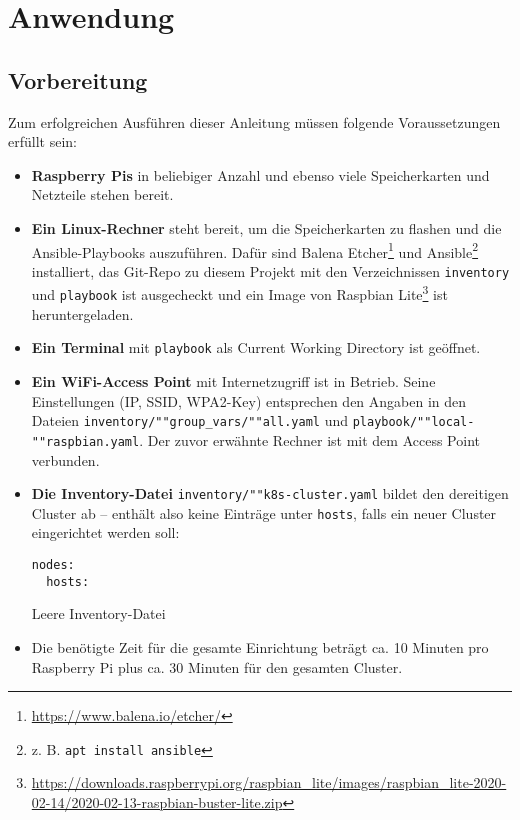 \chapter{Anwendung}


\section{Vorbereitung}
Zum erfolgreichen Ausführen dieser Anleitung müssen folgende Voraussetzungen erfüllt sein:

\begin{itemize}
    \item \textbf{Raspberry Pis} in beliebiger Anzahl und ebenso viele Speicherkarten und Netzteile stehen bereit.
    \item \textbf{Ein Linux-Rechner} steht bereit, um die Speicherkarten zu flashen und die Ansible-Playbooks auszuführen. Dafür sind Balena Etcher\footnote{\url{https://www.balena.io/etcher/}} und Ansible\footnote{z. B. \texttt{apt install ansible}} installiert, das Git-Repo zu diesem Projekt mit den Verzeichnissen \texttt{inventory} und \texttt{playbook} ist ausgecheckt und ein Image von Raspbian Lite\footnote{\url{https://downloads.raspberrypi.org/raspbian_lite/images/raspbian_lite-2020-02-14/2020-02-13-raspbian-buster-lite.zip}} ist heruntergeladen.
    \item \textbf{Ein Terminal} mit \texttt{playbook} als Current Working Directory ist geöffnet.
    \item \textbf{Ein WiFi-Access Point} mit Internetzugriff ist in Betrieb. Seine Einstellungen (IP, SSID, WPA2-Key) entsprechen den Angaben in den Dateien \texttt{inventory/""group\_vars/""all.yaml} und \texttt{playbook/""local-""raspbian.yaml}. Der zuvor erwähnte Rechner ist mit dem Access Point verbunden.
    \item \textbf{Die Inventory-Datei} \texttt{inventory/""k8s-cluster.yaml} bildet den dereitigen Cluster ab -- enthält also keine Einträge unter \texttt{hosts}, falls ein neuer Cluster eingerichtet werden soll:

        \begin{lstlisting}
nodes:
  hosts:
        \end{lstlisting}
        \caption{Leere Inventory-Datei}
    \item Die benötigte Zeit für die gesamte Einrichtung beträgt ca. 10 Minuten pro Raspberry Pi plus ca. 30 Minuten für den gesamten Cluster.
\end{itemize}

